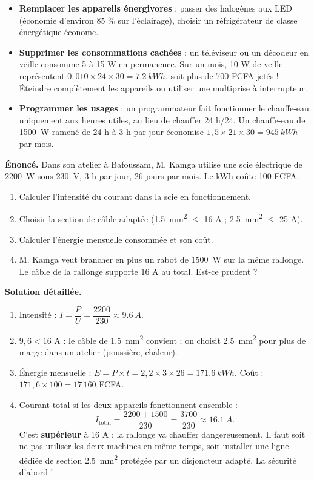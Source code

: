 \documentclass[11pt]{article}
\begin{document}
\begin{itemize}
\item \textbf{Remplacer les appareils énergivores} : passer des halogènes aux LED (économie d'environ 85 \% sur l'éclairage), choisir un réfrigérateur de classe énergétique économe.
\item \textbf{Supprimer les consommations cachées} : un téléviseur ou un décodeur en veille consomme 5 à 15 W en permanence. Sur un mois, 10 W de veille représentent $0{,}010 \times 24 \times 30 = \SI{7,2}{kWh}$, soit plus de 700 FCFA jetés ! Éteindre complètement les appareils ou utiliser une multiprise à interrupteur.
\item \textbf{Programmer les usages} : un programmateur fait fonctionner le chauffe-eau uniquement aux heures utiles, au lieu de chauffer 24 h/24. Un chauffe-eau de \SI{1500}{W} ramené de 24 h à 3 h par jour économise $1{,}5 \times 21 \times 30 = \SI{945}{kWh}$ par mois.
\end{itemize}

\begin{exoresolu}
\textbf{Énoncé.} Dans son atelier à Bafoussam, M. Kamga utilise une scie électrique de \SI{2200}{W} sous \SI{230}{V}, 3 h par jour, 26 jours par mois. Le kWh coûte 100 FCFA.
\begin{enumerate}
\item Calculer l'intensité du courant dans la scie en fonctionnement.
\item Choisir la section de câble adaptée (\SI{1,5}{mm^2} $\leq$ 16 A ; \SI{2,5}{mm^2} $\leq$ 25 A).
\item Calculer l'énergie mensuelle consommée et son coût.
\item M. Kamga veut brancher en plus un rabot de \SI{1500}{W} sur la même rallonge. Le câble de la rallonge supporte 16 A au total. Est-ce prudent ?
\end{enumerate}
\tcblower
\textbf{Solution détaillée.}
\begin{enumerate}
\item Intensité : $I = \dfrac{P}{U} = \dfrac{2200}{230} \approx \SI{9,6}{A}$.
\item $9{,}6 < 16$ A : le câble de \SI{1,5}{mm^2} convient ; on choisit \SI{2,5}{mm^2} pour plus de marge dans un atelier (poussière, chaleur).
\item Énergie mensuelle : $E = P \times t = 2{,}2 \times 3 \times 26 = \SI{171,6}{kWh}$. Coût : $171{,}6 \times 100 = 17\,160$ FCFA.
\item Courant total si les deux appareils fonctionnent ensemble :
\[
I_{\text{total}} = \dfrac{2200 + 1500}{230} = \dfrac{3700}{230} \approx \SI{16,1}{A}.
\]
C'est \textbf{supérieur} à 16 A : la rallonge va chauffer dangereusement. Il faut soit ne pas utiliser les deux machines en même temps, soit installer une ligne dédiée de section \SI{2,5}{mm^2} protégée par un disjoncteur adapté. La sécurité d'abord !
\end{enumerate}
\end{exoresolu}
\end{document}
